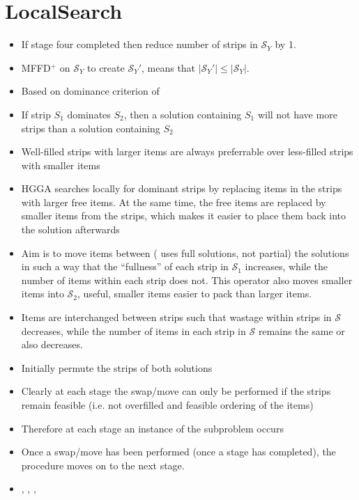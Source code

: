 \documentclass{elsarticle}
\begin{document}
\section{LocalSearch}
\begin{itemize}
	\item If stage four completed then reduce number of strips in $\mathcal{S}_Y$ by 1.
	\item MFFD$^+$ on $\mathcal{S}_Y$ to create $\mathcal{S}_Y'$, means that $|\mathcal{S}_Y'| \leq |\mathcal{S}_Y|$.
	\item Based on dominance criterion of \cite{martello1990l}
	\item If strip $S_1$ dominates $S_2$, then a solution containing $S_1$ will not have more strips than a solution containing $S_2$
	\item Well-filled strips with larger items are always preferrable over less-filled strips with smaller items \cite{levine2004}
	\item HGGA \cite{falkenauer1996} searches locally for dominant strips by replacing items in the strips with larger free items. At the same time, the free items are replaced by smaller items from the strips, which makes it easier to place them back into the solution afterwards
	\item Aim is to move items between (\cite{lewis2009} uses full solutions, not partial) the solutions in such a way that the ``fullness'' of each strip in $\mathcal{S}_1$ increases, while the number of items within each strip does not. This operator also moves smaller items into $\mathcal{S}_2$, useful, smaller items easier to pack than larger items.
	\item Items are interchanged between strips such that wastage within strips in $\mathcal{S}$ decreases, while the number of items in each strip in $\mathcal{S}$ remains the same or also decreases. \cite{lewis2017}
	\item Initially permute the strips of both solutions
	\item Clearly at each stage the swap/move can only be performed if the strips remain feasible (i.e. not overfilled and feasible ordering of the items)
	\item Therefore at each stage an instance of the subproblem occurs
	\item Once a swap/move has been performed (once a stage has completed), the procedure moves on to the next stage.
	\item \cite{lewis2009}, \cite{levine2004}, \cite{falkenauer1996}, \cite{martello1990l}

\end{itemize}
\end{document}
